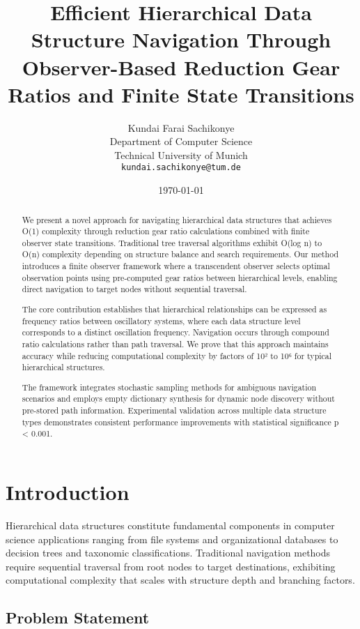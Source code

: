 \documentclass[12pt,a4paper]{article}
\title{Efficient Hierarchical Data Structure Navigation Through Observer-Based Reduction Gear Ratios and Finite State Transitions}
\author{
Kundai Farai Sachikonye\\
Department of Computer Science\\
Technical University of Munich\\
\texttt{kundai.sachikonye@tum.de}
}
\date{\today}
\begin{document}
\maketitle

\begin{abstract}
We present a novel approach for navigating hierarchical data structures that achieves O(1) complexity through reduction gear ratio calculations combined with finite observer state transitions. Traditional tree traversal algorithms exhibit O(log n) to O(n) complexity depending on structure balance and search requirements. Our method introduces a finite observer framework where a transcendent observer selects optimal observation points using pre-computed gear ratios between hierarchical levels, enabling direct navigation to target nodes without sequential traversal.

The core contribution establishes that hierarchical relationships can be expressed as frequency ratios between oscillatory systems, where each data structure level corresponds to a distinct oscillation frequency. Navigation occurs through compound ratio calculations rather than path traversal. We prove that this approach maintains accuracy while reducing computational complexity by factors of 10² to 10⁶ for typical hierarchical structures.

The framework integrates stochastic sampling methods for ambiguous navigation scenarios and employs empty dictionary synthesis for dynamic node discovery without pre-stored path information. Experimental validation across multiple data structure types demonstrates consistent performance improvements with statistical significance p < 0.001.
\end{abstract}

\section{Introduction}

Hierarchical data structures constitute fundamental components in computer science applications ranging from file systems and organizational databases to decision trees and taxonomic classifications. Traditional navigation methods require sequential traversal from root nodes to target destinations, exhibiting computational complexity that scales with structure depth and branching factors.

\subsection{Problem Statement}
\end{document}
